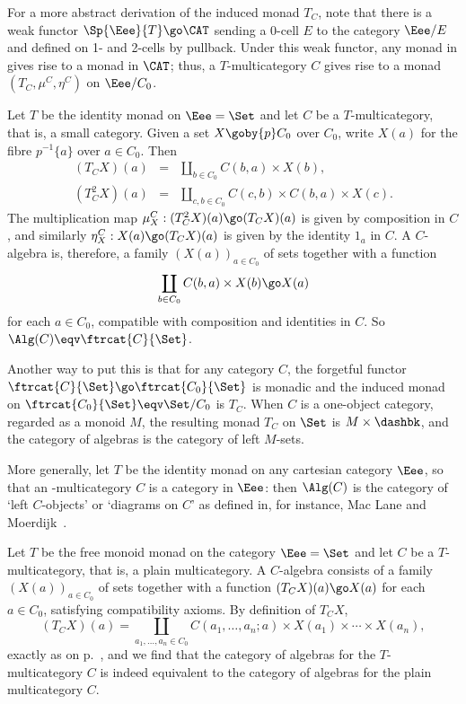 For a more abstract derivation of the induced monad $T_C$, note that there
is a weak functor $\Sp{\Eee}{T} \go \CAT$ sending a 0-cell $E$ to the
category $\Eee/E$%
%
%
and defined on 1- and 2-cells by pullback.  Under this
weak functor, any monad in  gives rise to a monad in $\CAT$;
thus, a $T$-multicategory $C$ gives rise to a monad $(T_C, \mu^C, \eta^C)$
on $\Eee/C_0$.

\begin{example}	
Let $T$ be the identity monad on $\Eee=\Set$ and let $C$ be a
$T$-multicategory, that is, a small category.  Given a set $X\goby{p}C_0$
over $C_0$, write $X(a)$ for the fibre $p^{-1}\{a\}$ over $a\in C_0$.  Then
%
\begin{eqnarray*}
(T_C X)(a) 	&= 	&\coprod_{b\in C_0} C(b,a) \times X(b), 	\\
(T_C^2 X)(a) 	&= 	&\coprod_{c,b\in C_0} C(c,b) \times C(b,a) \times 
			 X(c).
\end{eqnarray*}
%
The multiplication map $\mu^C_X: (T_C^2 X)(a) \go (T_C X)(a)$ is given by
composition in $C$, and similarly $\eta^C_X: X(a) \go (T_C X)(a)$ is given
by the identity $1_a$ in $C$.  A $C$-algebra is, therefore, a family
$(X(a))_{a\in C_0}$ of sets together with a function
%
\begin{equation}	\label{eq:cat-action}
\coprod_{b\in C_0} C(b,a) \times X(b) 
\go
X(a)
\end{equation}
%
for each $a\in C_0$, compatible with composition and identities in $C$.  So
$\Alg(C) \eqv \ftrcat{C}{\Set}$.

Another way to put this is that for any category $C$, the forgetful functor
$\ftrcat{C}{\Set} \go \ftrcat{C_0}{\Set}$ is monadic and the induced monad
on $\ftrcat{C_0}{\Set} \eqv \Set/C_0$ is $T_C$.  When $C$ is a one-object
category, regarded as a monoid $M$, the resulting monad $T_C$ on $\Set$ is
$M\times\dashbk$, and the category of algebras is the category of left
$M$-sets.%
%
%
%
%

More generally, let $T$ be the identity monad on any cartesian category
$\Eee$, so that an \Cartpr-multicategory $C$ is a category in $\Eee$: then
$\Alg(C)$ is the category of `left $C$-objects' or `diagrams%
%
%
on $C$' as
defined in, for instance, Mac Lane and Moerdijk~\cite[V.7]{MM}.
\end{example}

\begin{example}	 
Let $T$ be the free monoid monad on the category $\Eee = \Set$ and let $C$
be a $T$-multicategory, that is, a plain multicategory.%
%
%
 A $C$-algebra 
consists of a family $(X(a))_{a\in C_0}$ of sets together with a function
$(T_C X)(a) \go X(a)$ for each $a \in C_0$, satisfying compatibility
axioms.  By definition of $T_C X$,
\[
(T_C X)(a) =
\coprod_{a_1, \ldots, a_n \in C_0} 
C(a_1, \ldots, a_n; a) \times X(a_1) \times \cdots \times X(a_n),
\]
exactly as on p.~\pageref{p:cl-endoftr}, and we find that the category of
algebras for the $T$-multicategory $C$ is indeed equivalent to the category
of algebras for the plain multicategory $C$.
\end{example}

